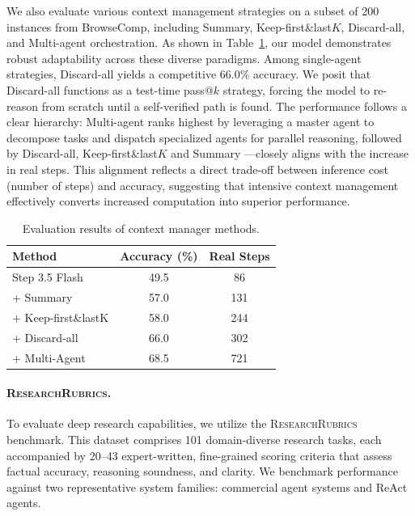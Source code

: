 We also evaluate various context management strategies on a subset of 200 instances from BrowseComp, including Summary, Keep-first\&last$K$, Discard-all, and Multi-agent orchestration. As shown in Table~\ref{tab:context_manager}, our model demonstrates robust adaptability across these diverse paradigms. Among single-agent strategies, Discard-all yields a competitive $66.0\%$ accuracy. We posit that Discard-all functions as a test-time pass@$k$ strategy, forcing the model to re-reason from scratch until a self-verified path is found. The performance follows a clear hierarchy: Multi-agent ranks highest by leveraging a master agent to decompose tasks and dispatch specialized agents for parallel reasoning, followed by Discard-all, Keep-first\&last$K$ and Summary —closely aligns with the increase in real steps. This alignment reflects a direct trade-off between inference cost (number of steps) and accuracy, suggesting that intensive context management effectively converts increased computation into superior performance.

\begin{table}[h]
\centering

\begin{tabular}{lcc}
\toprule
\rowcolor{header_gray}
\textbf{Method} & \textbf{Accuracy (\%)} & \textbf{Real Steps} \\
\midrule
Step 3.5 Flash & 49.5 & 86 \\
+ Summary & 57.0  & 131 \\
+ Keep-first\&lastK & 58.0  & 244 \\
+ Discard-all & 66.0  & 302 \\
+ Multi-Agent & 68.5 & 721 \\
\bottomrule
\end{tabular}
\caption{Evaluation results of context manager methods.}
\label{tab:context_manager}
\end{table}

\paragraph{\textsc{ResearchRubrics}.}

To evaluate deep research capabilities, we utilize the \textsc{ResearchRubrics}~\cite{sharma2025researchrubrics} benchmark. This dataset comprises 101 domain-diverse research tasks, each accompanied by 20--43 expert-written, fine-grained scoring criteria that assess factual accuracy, reasoning soundness, and clarity. We benchmark performance against two representative system families: commercial agent systems and ReAct agents.

